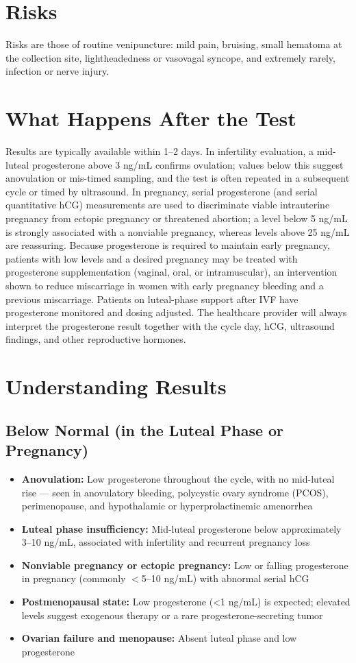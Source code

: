 \section*{Risks}
Risks are those of routine venipuncture: mild pain, bruising, small hematoma at the collection site, lightheadedness or vasovagal syncope, and extremely rarely, infection or nerve injury.

\section*{What Happens After the Test}
Results are typically available within 1--2 days. In infertility evaluation, a mid-luteal progesterone above 3 ng/mL confirms ovulation; values below this suggest anovulation or mis-timed sampling, and the test is often repeated in a subsequent cycle or timed by ultrasound. In pregnancy, serial progesterone (and serial quantitative hCG) measurements are used to discriminate viable intrauterine pregnancy from ectopic pregnancy or threatened abortion; a level below 5 ng/mL is strongly associated with a nonviable pregnancy, whereas levels above 25 ng/mL are reassuring. Because progesterone is required to maintain early pregnancy, patients with low levels and a desired pregnancy may be treated with progesterone supplementation (vaginal, oral, or intramuscular), an intervention shown to reduce miscarriage in women with early pregnancy bleeding and a previous miscarriage. Patients on luteal-phase support after IVF have progesterone monitored and dosing adjusted. The healthcare provider will always interpret the progesterone result together with the cycle day, hCG, ultrasound findings, and other reproductive hormones.

\section*{Understanding Results}

\subsection*{Below Normal (in the Luteal Phase or Pregnancy)}
\begin{itemize}
  \item \textbf{Anovulation:} Low progesterone throughout the cycle, with no mid-luteal rise --- seen in anovulatory bleeding, polycystic ovary syndrome (PCOS), perimenopause, and hypothalamic or hyperprolactinemic amenorrhea
  \item \textbf{Luteal phase insufficiency:} Mid-luteal progesterone below approximately 3--10 ng/mL, associated with infertility and recurrent pregnancy loss
  \item \textbf{Nonviable pregnancy or ectopic pregnancy:} Low or falling progesterone in pregnancy (commonly $<$5--10 ng/mL) with abnormal serial hCG
  \item \textbf{Postmenopausal state:} Low progesterone (<1 ng/mL) is expected; elevated levels suggest exogenous therapy or a rare progesterone-secreting tumor
  \item \textbf{Ovarian failure and menopause:} Absent luteal phase and low progesterone
\end{itemize}

